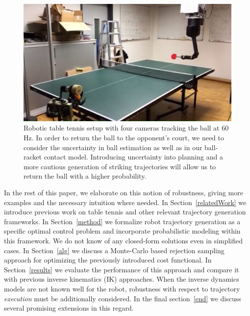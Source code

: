 \documentclass[letterpaper, 10 pt, conference]{ieeeconf}
\begin{document}

\begin{figure}[t!]
\center
\includegraphics[scale=0.4]{robot1.png}			
\caption{Robotic table tennis setup with four cameras tracking the ball at 60 Hz. In order to return the ball to the opponent's court, we need to consider the uncertainty in ball estimation as well as in our ball-racket contact model. Introducing uncertainty into planning and a more cautious generation of striking trajectories will allow us to return the ball with a higher probability.}
\label{robot}
\end{figure}

In the rest of this paper, we elaborate on this notion of robustness, giving more examples and the necessary intuition where needed. In Section~\ref{relatedWork} we introduce previous work on table tennis and other relevant trajectory generation frameworks. In Section~\ref{method} we formalize robot trajectory generation as a specific optimal control problem and incorporate probabilistic modeling within this framework. We do not know of any closed-form solutions even in simplified cases. In Section~\ref{alg} we discuss a Monte-Carlo based rejection sampling approach for optimizing the previously introduced cost functional. In Section~\ref{results} we evaluate the performance of this approach and compare it with previous inverse kinematics (IK) approaches. When the inverse dynamics models are not known well for the robot, robustness with respect to trajectory \emph{execution} must be additionally considered. In the final section~\ref{end} we discuss several promising extensions in this regard. %
\end{document}
